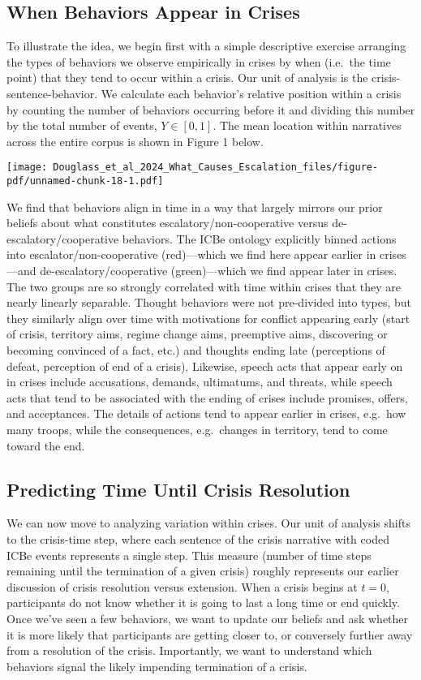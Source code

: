 \documentclass[
  letterpaper,
  DIV=11,
  numbers=noendperiod]{scrartcl}
\begin{document}
\subsection{When Behaviors Appear in
Crises}\label{when-behaviors-appear-in-crises}

To illustrate the idea, we begin first with a simple descriptive
exercise arranging the types of behaviors we observe empirically in
crises by when (i.e.~the time point) that they tend to occur within a
crisis. Our unit of analysis is the crisis-sentence-behavior. We
calculate each behavior's relative position within a crisis by counting
the number of behaviors occurring before it and dividing this number by
the total number of events, \(Y∈[0,1]\). The mean location within
narratives across the entire corpus is shown in Figure 1 below.

\texttt{[image: Douglass\_et\_al\_2024\_What\_Causes\_Escalation\_files/figure-pdf/unnamed-chunk-18-1.pdf]}

We find that behaviors align in time in a way that largely mirrors our
prior beliefs about what constitutes escalatory/non-cooperative versus
de-escalatory/cooperative behaviors. The ICBe ontology explicitly binned
actions into escalator/non-cooperative (red)---which we find here appear
earlier in crises---and de-escalatory/cooperative (green)---which we
find appear later in crises. The two groups are so strongly correlated
with time within crises that they are nearly linearly separable. Thought
behaviors were not pre-divided into types, but they similarly align over
time with motivations for conflict appearing early (start of crisis,
territory aims, regime change aims, preemptive aims, discovering or
becoming convinced of a fact, etc.) and thoughts ending late
(perceptions of defeat, perception of end of a crisis). Likewise, speech
acts that appear early on in crises include accusations, demands,
ultimatums, and threats, while speech acts that tend to be associated
with the ending of crises include promises, offers, and acceptances. The
details of actions tend to appear earlier in crises, e.g.~how many
troops, while the consequences, e.g.~changes in territory, tend to come
toward the end.

\subsection{Predicting Time Until Crisis
Resolution}\label{predicting-time-until-crisis-resolution}

We can now move to analyzing variation within crises. Our unit of
analysis shifts to the crisis-time step, where each sentence of the
crisis narrative with coded ICBe events represents a single step. This
measure (number of time steps remaining until the termination of a given
crisis) roughly represents our earlier discussion of crisis resolution
versus extension. When a crisis begins at \(t=0\), participants do not
know whether it is going to last a long time or end quickly. Once we've
seen a few behaviors, we want to update our beliefs and ask whether it
is more likely that participants are getting closer to, or conversely
further away from a resolution of the crisis. Importantly, we want to
understand which behaviors signal the likely impending termination of a
crisis.
\end{document}
